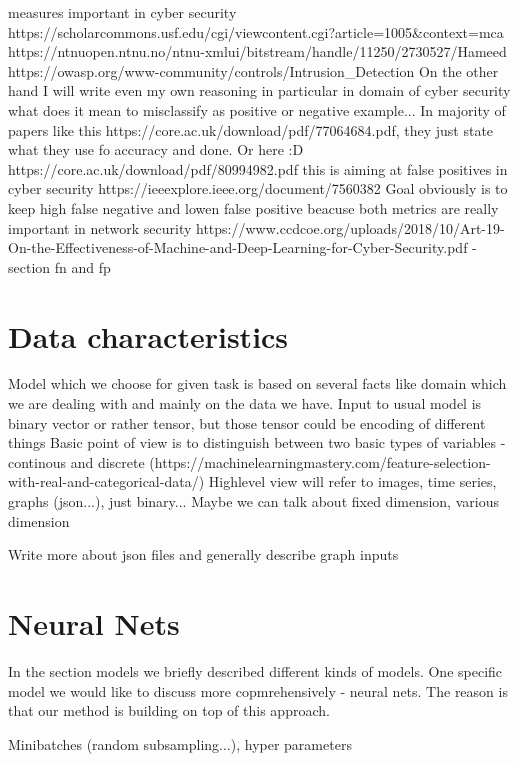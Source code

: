measures important in cyber security
https://scholarcommons.usf.edu/cgi/viewcontent.cgi?article=1005&context=mca
https://ntnuopen.ntnu.no/ntnu-xmlui/bitstream/handle/11250/2730527/Hameed%
https://owasp.org/www-community/controls/Intrusion_Detection
On the other hand I will write even my own reasoning in particular in domain of cyber security what does it mean to misclassify as positive or negative example...
In majority of papers like this https://core.ac.uk/download/pdf/77064684.pdf, they just state what they use fo accuracy and done. Or here :D https://core.ac.uk/download/pdf/80994982.pdf
this is aiming at false positives in cyber security https://ieeexplore.ieee.org/document/7560382
Goal obviously is to keep high false negative and lowen false positive beacuse both metrics are really important in network security
https://www.ccdcoe.org/uploads/2018/10/Art-19-On-the-Effectiveness-of-Machine-and-Deep-Learning-for-Cyber-Security.pdf - section fn and fp



\section{Data characteristics}
Model which we choose for given task is based on several facts like domain which we are dealing with and mainly on the data we have.
Input to usual model is binary vector or rather tensor, but those tensor could be encoding of different things
Basic point of view is to distinguish between two basic types of variables - continous and discrete (https://machinelearningmastery.com/feature-selection-with-real-and-categorical-data/)
Highlevel view will refer to images, time series, graphs (json...), just binary...
Maybe we can talk about fixed dimension, various dimension

Write more about json files and generally describe graph inputs

\section{Neural Nets}
In the section models  we briefly described different kinds of models. One specific model we would like to discuss more copmrehensively - neural nets. The reason is that our method is building on top of this approach.

Minibatches (random subsampling...), hyper parameters

